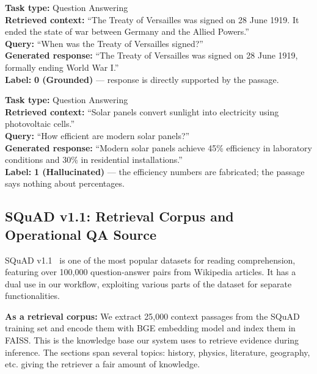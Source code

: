 \begin{dataformatbox}
\small
\textbf{Task type:} Question Answering\\[3pt]
\textbf{Retrieved context:} ``The Treaty of Versailles was signed on 28 June 1919. It ended the state of war between Germany and the Allied Powers.''\\[3pt]
\textbf{Query:} ``When was the Treaty of Versailles signed?''\\[3pt]
\textbf{Generated response:} ``The Treaty of Versailles was signed on 28 June 1919, formally ending World War I.''\\[3pt]
\textbf{Label:} \textcolor{acceptgreen}{\textbf{0 (Grounded)}} --- response is directly supported by the passage.
\end{dataformatbox}

\vspace{0.4em}

\begin{dataformatbox}
\small
\textbf{Task type:} Question Answering\\[3pt]
\textbf{Retrieved context:} ``Solar panels convert sunlight into electricity using photovoltaic cells.''\\[3pt]
\textbf{Query:} ``How efficient are modern solar panels?''\\[3pt]
\textbf{Generated response:} ``Modern solar panels achieve 45\% efficiency in laboratory conditions and 30\% in residential installations.''\\[3pt]
\textbf{Label:} \textcolor{abstainred}{\textbf{1 (Hallucinated)}} --- the efficiency numbers are fabricated; the passage says nothing about percentages.
\end{dataformatbox}

\subsection{SQuAD v1.1: Retrieval Corpus and Operational QA Source}
\label{sec:squad}

SQuAD v1.1~\cite{rajpurkar2016squad} is one of the most popular datasets for reading comprehension, featuring over 100{,}000 question-answer pairs from Wikipedia articles. It has a dual use in our workflow, exploiting various parts of the dataset for separate functionalities.

\textbf{As a retrieval corpus:} We extract 25,000 context passages from the SQuAD training set and encode them with BGE embedding model and index them in FAISS. This is the knowledge base our system uses to retrieve evidence during inference. The sections span several topics: history, physics, literature, geography, etc. giving the retriever a fair amount of knowledge. 

